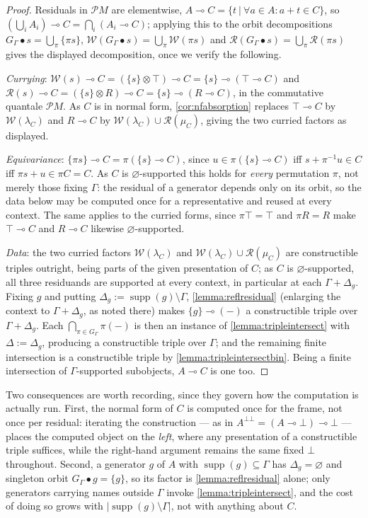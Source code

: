 \documentclass{article}
\theoremstyle{definition}
\newcommand{\cP}{\mathcal{P}}
\newcommand{\cR}{\mathcal{R}}
\newcommand{\cW}{\mathcal{W}}
\newcommand{\supp}{\operatorname{supp}}
\begin{document}
\begin{proof}
    Residuals in $\cP M$ are elementwise, $A\multimap C=\{t\ |\ \forall a\in A\colon a+t\in C\}$, so $(\bigcup_iA_i)\multimap C=\bigcap_i(A_i\multimap C)$; applying this to the orbit decompositions $G_\Gamma\bullet s=\bigcup_\pi\{\pi s\}$, $\cW(G_\Gamma\bullet s)=\bigcup_\pi\cW(\pi s)$ and $\cR(G_\Gamma\bullet s)=\bigcup_\pi\cR(\pi s)$ gives the displayed decomposition, once we verify the following.

    {\it Currying}: $\cW(s)\multimap C=(\{s\}\otimes\top)\multimap C=\{s\}\multimap(\top\multimap C)$ and $\cR(s)\multimap C=(\{s\}\otimes R)\multimap C=\{s\}\multimap(R\multimap C)$, in the commutative quantale $\cP M$. As $C$ is in normal form, \cref{cor:nfabsorption} replaces $\top\multimap C$ by $\cW(\lambda_C)$ and $R\multimap C$ by $\cW(\lambda_C)\cup\cR(\mu_C)$, giving the two curried factors as displayed.

    {\it Equivariance}: $\{\pi s\}\multimap C=\pi(\{s\}\multimap C)$, since $u\in\pi(\{s\}\multimap C)$ iff $s+\pi^{-1}u\in C$ iff $\pi s+u\in\pi C=C$. As $C$ is $\varnothing$-supported this holds for {\em every} permutation $\pi$, not merely those fixing $\Gamma$: the residual of a generator depends only on its orbit, so the data below may be computed once for a representative and reused at every context. The same applies to the curried forms, since $\pi\top=\top$ and $\pi R=R$ make $\top\multimap C$ and $R\multimap C$ likewise $\varnothing$-supported.

    {\it Data}: the two curried factors $\cW(\lambda_C)$ and $\cW(\lambda_C)\cup\cR(\mu_C)$ are constructible triples outright, being parts of the given presentation of $C$; as $C$ is $\varnothing$-supported, all three residuands are supported at every context, in particular at each $\Gamma+\Delta_g$. Fixing $g$ and putting $\Delta_g:=\supp(g)\setminus\Gamma$, \cref{lemma:reflresidual} (enlarging the context to $\Gamma+\Delta_g$, as noted there) makes $\{g\}\multimap(-)$ a constructible triple over $\Gamma+\Delta_g$. Each $\bigcap_{\pi\in G_\Gamma}\pi(-)$ is then an instance of \cref{lemma:tripleintersect} with $\Delta:=\Delta_g$, producing a constructible triple over $\Gamma$; and the remaining finite intersection is a constructible triple by \cref{lemma:tripleintersectbin}. Being a finite intersection of $\Gamma$-supported subobjects, $A\multimap C$ is one too.
\end{proof}

Two consequences are worth recording, since they govern how the computation is actually run. First, the normal form of $C$ is computed once for the frame, not once per residual: iterating the construction --- as in $A^{\bot\bot}=(A\multimap\bot)\multimap\bot$ --- places the computed object on the {\em left}, where any presentation of a constructible triple suffices, while the right-hand argument remains the same fixed $\bot$ throughout. Second, a generator $g$ of $A$ with $\supp(g)\subseteq\Gamma$ has $\Delta_g=\varnothing$ and singleton orbit $G_\Gamma\bullet g=\{g\}$, so its factor is \cref{lemma:reflresidual} alone; only generators carrying names outside $\Gamma$ invoke \cref{lemma:tripleintersect}, and the cost of doing so grows with $|\supp(g)\setminus\Gamma|$, not with anything about $C$.
\end{document}
